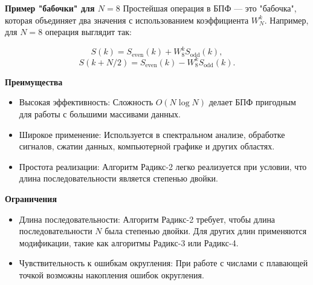   \textbf{Пример "бабочки" для \( N=8 \)}
  Простейшая операция в БПФ — это "бабочка", которая объединяет два значения с использованием коэффициента \( W_N^k \). Например, для \( N=8 \) операция выглядит так:
  
  \[
  S(k) = S_{\text{even}}(k) + W_8^k S_{\text{odd}}(k),\tag{2.24}
  \]
  \[
  S(k+N/2) = S_{\text{even}}(k) - W_8^k S_{\text{odd}}(k). \tag{2.25}
  \]
  
 
  

  \textbf{Преимущества}
  \begin{itemize}
      \item Высокая эффективность: Сложность \( O(N \log N) \) делает БПФ пригодным для работы с большими массивами данных.
      \item Широкое применение: Используется в спектральном анализе, обработке сигналов, сжатии данных, компьютерной графике и других областях.
      \item Простота реализации: Алгоритм Радикс-2 легко реализуется при условии, что длина последовательности является степенью двойки.
  \end{itemize}
  
  \textbf{Ограничения}
  \begin{itemize}
      \item Длина последовательности: Алгоритм Радикс-2 требует, чтобы длина последовательности \( N \) была степенью двойки. Для других длин применяются модификации, такие как алгоритмы Радикс-3 или Радикс-4.
      \item Чувствительность к ошибкам округления: При работе с числами с плавающей точкой возможны накопления ошибок округления.
  \end{itemize}
  
